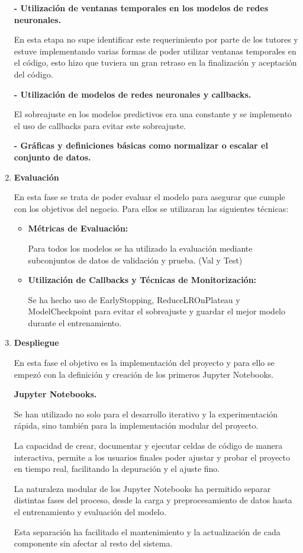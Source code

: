 \begin{enumerate}
\textbf{- Utilización de ventanas temporales en los modelos de redes neuronales.} 

	En esta etapa no supe identificar este requerimiento por parte de los tutores y estuve implementando varias formas de poder utilizar ventanas temporales en el código, esto hizo que tuviera un gran retraso en la finalización y aceptación del código.

\textbf{- Utilización de modelos de redes neuronales y callbacks.} 

	El sobreajuste en los modelos predictivos era una constante y se implemento el uso de callbacks para evitar este sobreajuste.


\textbf{- Gráficas y definiciones básicas como normalizar o escalar el conjunto de datos.}



\item
\textbf{Evaluación}


En esta fase se trata de poder evaluar el modelo para asegurar que cumple con los objetivos del negocio. Para ellos se utilizaran las siguientes técnicas:


	\begin{itemize}
	
	\item
	\textbf{Métricas de Evaluación:}

Para todos los modelos se ha utilizado la evaluación mediante subconjuntos de datos de validación y prueba. (Val y Test)

	\item
	\textbf{Utilización de Callbacks y Técnicas de Monitorización:}

 Se ha hecho uso de EarlyStopping, ReduceLROnPlateau y ModelCheckpoint para evitar el sobreajuste y guardar el mejor modelo durante el entrenamiento.
	\end{itemize}


\item
\textbf{Despliegue}

En esta fase el objetivo es la implementación del proyecto y para ello se empezó con la definición y creación de los primeros Jupyter Notebooks.


\textbf{Jupyter Notebooks.} 

Se han utilizado no solo para el desarrollo iterativo y la experimentación rápida, sino también para la implementación modular del proyecto. 

La capacidad de crear, documentar y ejecutar celdas de código de manera interactiva, permite a los usuarios finales poder ajustar y probar el proyecto en tiempo real, facilitando la depuración y el ajuste fino.

La naturaleza modular de los Jupyter Notebooks ha permitido separar distintas fases del proceso, desde la carga y preprocesamiento de datos hasta el entrenamiento y evaluación del modelo. 

Esta separación ha facilitado el mantenimiento y la actualización de cada componente sin afectar al resto del sistema.

\end{enumerate}

